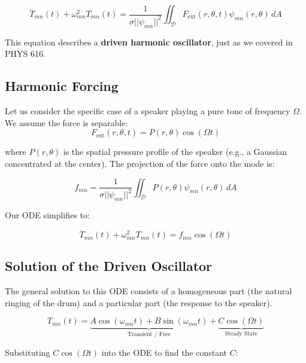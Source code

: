 \documentclass[11pt, letterpaper]{article}
\begin{document}
\begin{equation}
    \ddot{T}_{mn}(t) + \omega_{mn}^2 T_{mn}(t) = \frac{1}{\sigma ||\psi_{mn}||^2} \iint_{\mathcal{D}} F_{\text{ext}}(r, \theta, t) \psi_{mn}(r, \theta) \, dA
\end{equation}

This equation describes a \textbf{driven harmonic oscillator}, just as we covered in PHYS 616.

\subsection{Harmonic Forcing}

Let us consider the specific case of a speaker playing a pure tone of frequency $\Omega$. We assume the force is separable:
\begin{equation}
    F_{\text{ext}}(r, \theta, t) = P(r, \theta) \cos(\Omega t)
\end{equation}

where $P(r, \theta)$ is the spatial pressure profile of the speaker (e.g., a Gaussian concentrated at the center). The projection of the force onto the mode is:

\begin{equation}
    f_{mn} = \frac{1}{\sigma ||\psi_{mn}||^2} \iint_{\mathcal{D}} P(r, \theta) \psi_{mn}(r, \theta) \, dA
\end{equation}

Our ODE simplifies to:

\begin{equation}
    \ddot{T}_{mn}(t) + \omega_{mn}^2 T_{mn}(t) = f_{mn} \cos(\Omega t)
\end{equation}

\subsection{Solution of the Driven Oscillator}

The general solution to this ODE consists of a homogeneous part (the natural ringing of the drum) and a particular part (the response to the speaker).

\begin{equation}
    T_{mn}(t) = \underbrace{A \cos(\omega_{mn} t) + B \sin(\omega_{mn} t)}_{\text{Transient / Free}} + \underbrace{C \cos(\Omega t)}_{\text{Steady State}}
\end{equation}

Substituting $C \cos(\Omega t)$ into the ODE to find the constant $C$:
\end{document}
